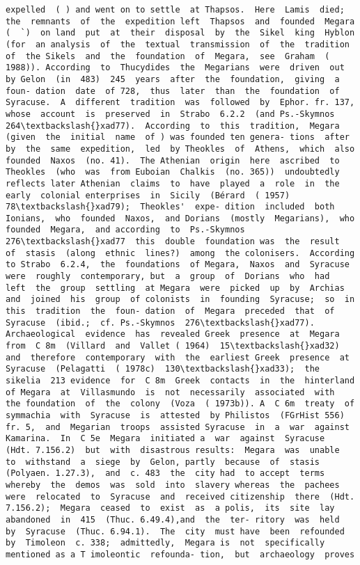 \documentclass[11pt]{article}
\begin{document}
\begin{Verbatim}[commandchars=\\\{\}]
expelled  ( ) and went on to settle  at Thapsos.  Here  Lamis  died;  the  remnants  of  the  expedition left  Thapsos  and  founded  Megara  (  `)  on land  put  at  their  disposal  by  the  Sikel  king  Hyblon  (for  an analysis  of  the  textual  transmission  of  the  tradition  of  the Sikels  and  the  foundation  of  Megara,  see  Graham  ( 1988)). According  to  Thucydides  the  Megarians  were  driven  out  by Gelon  (in  483)  245  years  after  the  foundation,  giving  a  foun- dation  date  of 728,  thus  later  than  the  foundation  of  Syracuse.  A  different  tradition  was  followed  by  Ephor. fr. 137,  whose  account  is  preserved  in  Strabo  6.2.2  (and Ps.-Skymnos  264\textbackslash{}xad77).  According  to  this  tradition,  Megara (given  the  initial  name  of ) was founded ten genera- tions  after     by  the  same  expedition,  led  by Theokles  of  Athens,  which  also  founded  Naxos  (no. 41).  The Athenian  origin  here  ascribed  to  Theokles  (who  was  from Euboian  Chalkis  (no. 365))  undoubtedly  reflects later Athenian  claims  to  have  played  a  role  in  the  early  colonial enterprises  in  Sicily  (Bérard  ( 1957)  78\textbackslash{}xad79);  Theokles'  expe- dition  included  both  Ionians,  who  founded  Naxos,  and Dorians  (mostly  Megarians),  who  founded  Megara,  and according  to  Ps.-Skymnos  276\textbackslash{}xad77  this  double  foundation was  the  result  of  stasis  (along  ethnic  lines?)  among  the colonisers.  According  to Strabo  6.2.4,  the  foundations  of Megara,  Naxos  and  Syracuse  were  roughly  contemporary, but  a  group  of  Dorians  who  had  left  the  group  settling  at Megara  were  picked  up  by  Archias  and  joined  his  group  of colonists  in  founding  Syracuse;  so  in  this  tradition  the  foun- dation  of  Megara  preceded  that  of  Syracuse  (ibid.;  cf. Ps.-Skymnos  276\textbackslash{}xad77).  Archaeological  evidence  has  revealed Greek  presence  at  Megara  from  C 8m  (Villard  and  Vallet ( 1964)  15\textbackslash{}xad32)  and  therefore  contemporary  with  the  earliest Greek  presence  at  Syracuse  (Pelagatti  ( 1978c)  130\textbackslash{}xad33);  the sikelia  213 evidence  for  C 8m  Greek  contacts  in  the  hinterland  of Megara  at  Villasmundo  is  not  necessarily  associated  with  the foundation  of  the  colony  (Voza  ( 1973b)). A  C 6m  treaty  of  symmachia  with  Syracuse  is  attested  by Philistos  (FGrHist 556)  fr. 5,  and  Megarian  troops  assisted Syracuse  in  a  war  against  Kamarina.  In  C 5e  Megara  initiated a  war  against  Syracuse  (Hdt. 7.156.2)  but  with  disastrous results:  Megara  was  unable  to  withstand  a  siege  by  Gelon, partly  because  of  stasis  (Polyaen. 1.27.3),  and  c. 483  the  city had  to accept  terms  whereby  the  demos  was  sold  into  slavery whereas  the  pachees  were  relocated  to  Syracuse  and  received citizenship  there  (Hdt. 7.156.2);  Megara  ceased  to  exist  as  a polis,  its  site  lay  abandoned  in  415  (Thuc. 6.49.4),and  the  ter- ritory  was  held  by  Syracuse  (Thuc. 6.94.1).  The  city  must have  been  refounded  by  Timoleon  c. 338;  admittedly,  Megara is  not  specifically mentioned as a T imoleontic  refounda- tion,  but  archaeology  proves  
\end{Verbatim}
\end{document}
